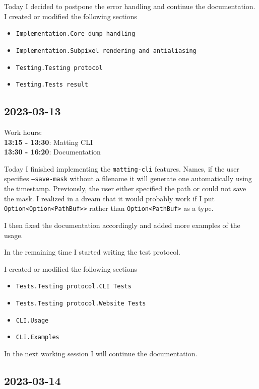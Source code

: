\documentclass{article}
\begin{document}
Today I decided to postpone the error handling and continue the documentation.
I created or modified the following sections
\begin{itemize}
    \item \texttt{Implementation.Core dump handling}
    \item \texttt{Implementation.Subpixel rendering and antialiasing}
    \item \texttt{Testing.Testing protocol}
    \item \texttt{Testing.Tests result}
\end{itemize}

\subsection{2023-03-13}

Work hours:\\
\textbf{13:15 - 13:30}: Matting CLI \\
\textbf{13:30 - 16:20}: Documentation

Today I finished implementing the \texttt{matting-cli} features.
Names, if the user specifies \texttt{--save-mask} without a filename
it will generate one automatically using the timestamp.
Previously, the user either specified the path or could not save the mask.
I realized in a dream that it would probably work if I put
\texttt{Option<Option<PathBuf>>} rather than \texttt{Option<PathBuf>} as a type.

I then fixed the documentation accordingly and added more examples of the usage.

In the remaining time I started writing the test protocol.

I created or modified the following sections
\begin{itemize}
    \item \texttt{Tests.Testing protocol.CLI Tests}
    \item \texttt{Tests.Testing protocol.Website Tests}
    \item \texttt{CLI.Usage}
    \item \texttt{CLI.Examples}
\end{itemize}

In the next working session I will continue
the documentation.

\pagebreak

\subsection{2023-03-14}
\end{document}
